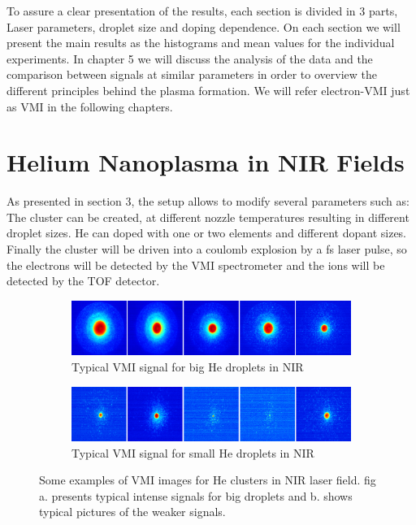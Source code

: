 To assure a clear presentation of the results, each section is divided in 3 parts, Laser parameters, droplet size and doping dependence. On each section we will present the main results as the histograms and mean values for the individual experiments. In chapter 5 we will discuss the analysis of the data and the comparison between signals at similar parameters in order to overview the different principles behind the plasma formation. We will refer electron-VMI just as VMI in the following chapters.


\section{Helium Nanoplasma in NIR Fields}

As presented in section 3, the setup allows to modify several parameters such as: The cluster can be created, at different nozzle temperatures resulting in different droplet sizes. He can doped with one or two elements and different dopant sizes. Finally the cluster will be driven into a coulomb explosion by a fs laser pulse, so the electrons will be detected by the VMI spectrometer and the ions will be detected by the TOF detector. 

\begin{figure}[h!]
\centering
\begin{subfigure}[l]{0.7\textwidth}
\caption{Typical VMI signal for big He droplets in NIR}
\includegraphics[width=1\textwidth]{../Images/results/NI_He_Dropletsize/RAW_NIR_HE_dropletsizeBigg.png}   				\end{subfigure}
\begin{subfigure}[l]{0.7\textwidth}
\caption{Typical VMI signal for small He droplets in NIR}
\includegraphics[width=1\textwidth]{../Images/results/NI_He_Dropletsize/RAW_NIR_HE_dropletsizeSmall.png} 
\end{subfigure}
\caption[examples NIR signal]{Some examples of VMI images for He clusters in NIR laser field. fig a. presents typical intense signals for big droplets and b. shows typical pictures of the weaker signals.}
\label{fig:NIRsample}
\end{figure}

